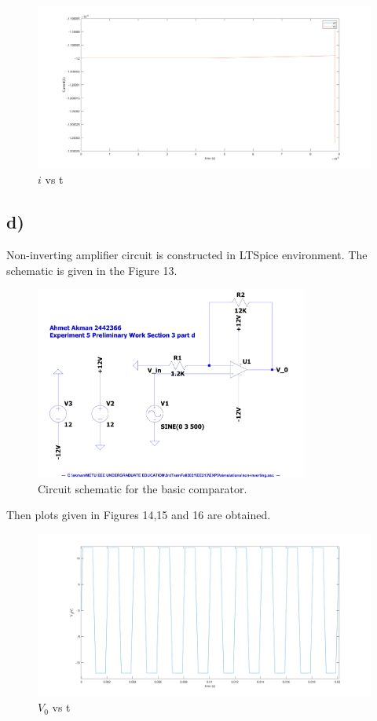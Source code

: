 \documentclass[letterpaper,12pt]{article}
\begin{document}
\begin{figure}[H]
	\centering
   \includegraphics[width=1\textwidth]{3c_i.png}
   \caption{\(i\) vs t}
\end{figure}

\subsection{d)}
Non-inverting amplifier circuit is constructed in LTSpice environment. The schematic is given in the Figure 13.
\begin{figure}[H]
	\centering
   \includegraphics[width=0.8\textwidth]{non-inverting_SCH.pdf}
   \caption{Circuit schematic for the basic comparator.}
\end{figure} 
Then plots given in Figures 14,15 and 16 are obtained.
\begin{figure}[H]
	\centering
   \includegraphics[width=1\textwidth]{3d_vs_t.png}
   \caption{\(V_0\) vs t}
\end{figure}
\end{document}
